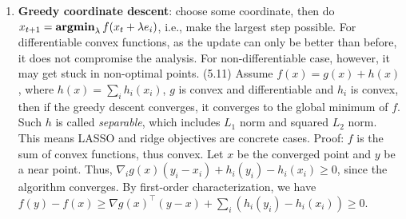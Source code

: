 \begin{enumerate}
    \item \textbf{Greedy coordinate descent}: choose some coordinate, then do $x_{t+1} = \operatorname{\textbf{argmin}}_\lambda f(x_t + \lambda e_i)$, i.e., make the largest step possible. For differentiable convex functions, as the update can only be better than before, it does not compromise the analysis. For non-differentiable case, however, it may get stuck in non-optimal points. (5.11) Assume $f(x) = g(x) + h(x)$, where $h(x) = \sum_i h_i (x_i)$, $g$ is convex and differentiable and $h_i$ is convex, then if the greedy descent converges, it converges to the global minimum of $f$. Such $h$ is called \emph{separable}, which includes $L_1$ norm and squared $L_2$ norm. This means LASSO and ridge objectives are concrete cases. Proof: $f$ is the sum of convex functions, thus convex. Let $x$ be the converged point and $y$ be a near point. Thus, $\nabla_i g(x) (y_i - x_i) + h_i(y_i) - h_i(x_i) \ge 0$, since the algorithm converges. By first-order characterization, we have $f(y) - f(x) \ge \nabla g(x)^\top (y-x) + \sum_i (h_i(y_i) - h_i(x_i)) \ge 0$.
\end{enumerate}